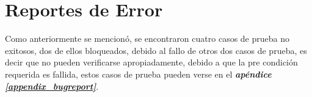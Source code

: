 \section{Reportes de Error}
Como anteriormente se mencionó, se encontraron cuatro casos de prueba no
exitosos, dos de ellos bloqueados, debido al fallo de otros dos casos de
prueba, es decir que no pueden verificarse apropiadamente, debido a que la
pre condición requerida es fallida, estos casos de prueba pueden verse en el
\emph{\textbf{apéndice \ref{appendix_bugreport}}}.

